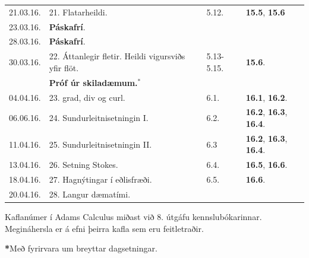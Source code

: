 \documentclass[a4paper,10pt,icelandic]{sphinxmanual}
\begin{document}
\begin{center}
\begin{tabular}{l|l|l|l}
\hline
21.03.16.&21. Flatarheildi.   &5.12.&{\bf 15.5}, {\bf 15.6}\\
23.03.16.& \textbf{Páskafrí}. &\\
\hline
28.03.16.&  \textbf{Páskafrí}. &\\
30.03.16.&22. Áttanlegir fletir. Heildi vigursviðs yfir flöt.&5.13-5.15.&  {\bf 15.6}.\\
&  {\bf Próf úr skiladæmum.$^\ast$} &\\
\hline
04.04.16.&23. grad, div og curl. &6.1.&{\bf 16.1}, {\bf 16.2}.\\
06.06.16.&24. Sundurleitnisetningin I. &6.2.&{\bf 16.2}, {\bf 16.3}, {\bf 16.4}.\\
\hline
11.04.16.&25. Sundurleitnisetningin II.&6.3& {\bf 16.2}, {\bf 16.3}, {\bf 16.4}.\\
13.04.16.&26. Setning Stokes.  &6.4.& {\bf 16.5}, {\bf 16.6}.\\
\hline
18.04.16.&27. Hagnýtingar í eðlisfræði. &6.5.& {\bf 16.6}.\\
20.04.16.&28. Langur dæmatími. & \\

\end{tabular}
\end{center}


Kaflanúmer í Adams Calculus miðast við 8. útgáfu kennslubókarinnar. Megináhersla er á efni þeirra kafla sem eru feitletraðir.

{\color{red}\bfseries{}*}Með fyrirvara um breyttar dagsetningar.



\renewcommand{\indexname}{Atriðaskrá}
\printindex
\end{document}
